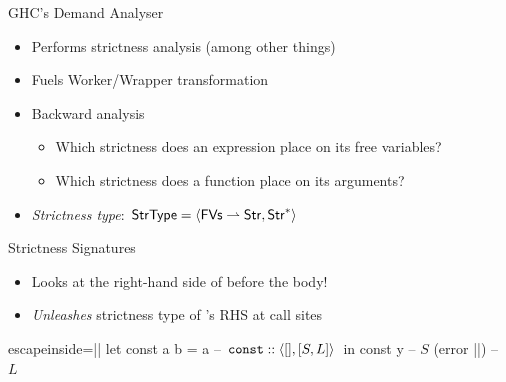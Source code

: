 \documentclass{haskellbeamer}
\begin{document}
\begin{frame}[fragile]{GHC's Demand Analyser}
  \begin{itemize}
    \item Performs strictness analysis (among other things)
    \item Fuels Worker/Wrapper transformation
    \item Backward analysis
      \begin{itemize}
        \item Which strictness does an expression place on its free variables?
        \item Which strictness does a function place on its arguments?
      \end{itemize}
    \item \emph{Strictness type}: $\text{\textsf{StrType}} = \left\langle{}\text{\textsf{FVs}} \rightharpoonup \text{\textsf{Str}},\text{\textsf{Str}}^*\right\rangle{}$
  \end{itemize}
\end{frame}

\begin{frame}[fragile]{Strictness Signatures}
  \begin{itemize}
    \item Looks at the right-hand side of  before the  body!
    \item \emph{Unleashes} strictness type of 's RHS at call sites
  \end{itemize}
  \begin{center}
    \begin{minipage}{0.8\textwidth}
      \begin{haskell*}{escapeinside=||}
        let const a b = a -- $\mathtt{const} :: \left\langle{}[],[S, L]\right\rangle{}$
        in const 
            y            -- $S$
            (error ||) -- $L$
      \end{haskell*}
    \end{minipage}
  \end{center}
\end{frame}
\end{document}
